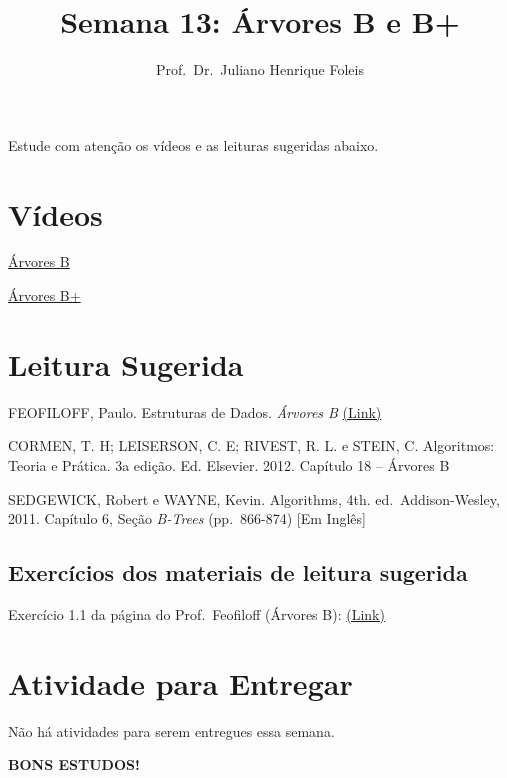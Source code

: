 \documentclass[]{article}
\title{Semana 13: Árvores B e B+}
\author{Prof.~Dr.~Juliano Henrique Foleis}
\date{}
\begin{document}
\maketitle

Estude com atenção os vídeos e as leituras sugeridas abaixo.

\hypertarget{vuxeddeos}{%
\section{Vídeos}\label{vuxeddeos}}

\href{https://youtu.be/5mC6TmviBPE}{Árvores B}

\href{https://youtu.be/x-NNKmdHm94}{Árvores B+}

\hypertarget{leitura-sugerida}{%
\section{Leitura Sugerida}\label{leitura-sugerida}}

FEOFILOFF, Paulo. Estruturas de Dados. \emph{Árvores B}
\href{https://www.ime.usp.br/~pf/estruturas-de-dados/aulas/B-trees.html}{(Link)}

CORMEN, T. H; LEISERSON, C. E; RIVEST, R. L. e STEIN, C. Algoritmos:
Teoria e Prática. 3a edição. Ed. Elsevier. 2012. Capítulo 18 -- Árvores
B

SEDGEWICK, Robert e WAYNE, Kevin. Algorithms, 4th. ed.~Addison-Wesley,
2011. Capítulo 6, Seção \emph{B-Trees} (pp.~866-874) {[}Em Inglês{]}

\hypertarget{exercuxedcios-dos-materiais-de-leitura-sugerida}{%
\subsection{Exercícios dos materiais de leitura
sugerida}\label{exercuxedcios-dos-materiais-de-leitura-sugerida}}

Exercício 1.1 da página do Prof.~Feofiloff (Árvores B):
\href{https://www.ime.usp.br/~pf/estruturas-de-dados/aulas/B-trees.html}{(Link)}

\hypertarget{atividade-para-entregar}{%
\section{Atividade para Entregar}\label{atividade-para-entregar}}

Não há atividades para serem entregues essa semana.

\centering
\vspace{40pt}
\Large

\textbf{BONS ESTUDOS!}
\end{document}
